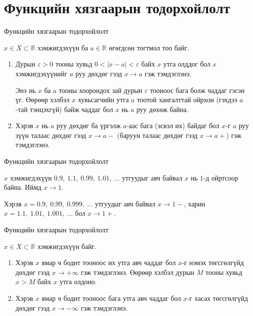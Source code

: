 

\providecommand{\R}{\mathbb{R}}
\providecommand{\N}{\mathbb{N}}
\providecommand{\tg}{\operatorname{tg}}
\section{Функцийн хязгаарын тодорхойлолт}
\begin{frame}[allowframebreaks]{Функцийн хязгаарын тодорхойлолт}
\begin{definition}
$x \in X \subset \mathbb{R}$ хэмжигдэхүүн ба $a \in \mathbb{R}$ өгөгдсөн тогтмол тоо байг.
\begin{enumerate}
\item Дурын $\varepsilon>0$ тооны хувьд $0<|x-a|<\varepsilon$ байх $x$ утга олддог бол $x$ хэмжигдэхүүнийг $a$ руу дөхдөг гээд $x \to a$ гэж тэмдэглэнэ.

Энэ нь $x$ ба $a$ тооны хоорондох зай дурын $\varepsilon$ тооноос бага болж чаддаг гэсэн үг.
Өөрөөр хэлбэл $x$ хувьсагчийн утга $a$ тоотой хангалттай ойрхон (гэхдээ $a$-тай тэнцэхгүй) байж чаддаг бол $x$ нь $a$ руу дөхөж байна.
\item Хэрэв $x$ нь $a$ руу дөхдөг ба үргэлж $a$-аас бага (эсвэл их) байдаг бол $x$-г $a$ руу зүүн талаас дөхдөг гээд $x \to a-$ (баруун талаас дөхдөг гээд $x \to a+$) гэж тэмдэглэнэ.
\end{enumerate}
\end{definition}
\end{frame}

\begin{frame}[allowframebreaks]{Функцийн хязгаарын тодорхойлолт}
\begin{example}
$x$ хэмжигдэхүүн $0.9,\ 1.1,\ 0.99,\ 1.01,\ \ldots$ утгуудыг авч байвал $x$ нь $1$-д ойртсоор байна. Иймд $x \to 1$.

Хэрэв $x=0.9,\ 0.99,\ 0.999,\ \ldots$ утгуудыг авч байвал $x \to 1-$, харин $x=1.1,\ 1.01,\ 1.001,\ \ldots$ бол $x \to 1+$.
\end{example}
\end{frame}

\begin{frame}[allowframebreaks]{Функцийн хязгаарын тодорхойлолт}
\begin{definition}
$x \in X \subset \mathbb{R}$ хэмжигдэхүүн байг.
\begin{enumerate}
\item Хэрэв $x$ ямар ч бодит тооноос их утга авч чаддаг бол $x$-г нэмэх төгсгөлгүйд дөхдөг гээд $x \to +\infty$ гэж тэмдэглэнэ.
Өөрөөр хэлбэл дурын $M$ тооны хувьд $x > M$ байх $x$ утга олдоно.
\item Хэрэв $x$ ямар ч бодит тооноос бага утга авч чаддаг бол $x$-г хасах төгсгөлгүйд дөхдөг гээд $x \to -\infty$ гэж тэмдэглэнэ.
\end{enumerate}
\end{definition}
\end{frame}

